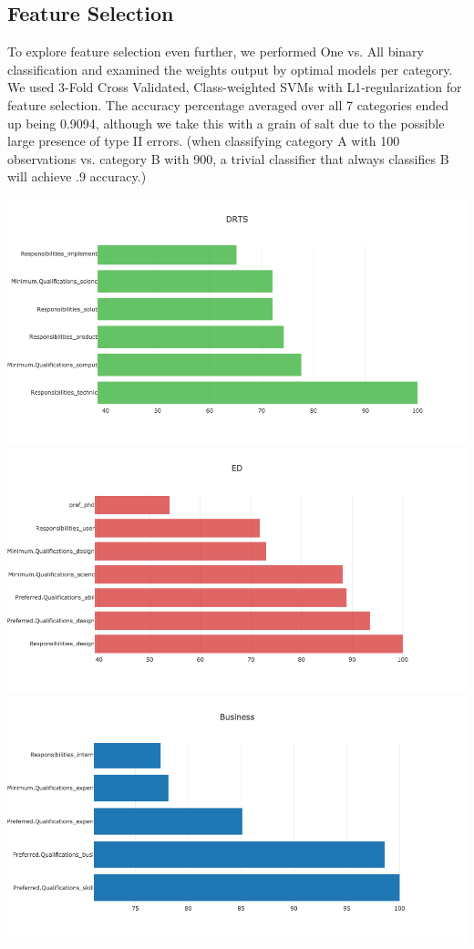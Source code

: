 \documentclass[9.5 pt]{article}
\begin{document}
\subsection{Feature Selection}

To explore feature selection even further, we performed One vs. All binary classification and examined the weights output by optimal models per category. We used 3-Fold Cross Validated, Class-weighted SVMs with L1-regularization for feature selection. The accuracy percentage averaged over all 7 categories ended up being 0.9094, although we take this with a grain of salt due to the possible large presence of type II errors. (when classifying category A with 100 observations vs. category B with 900, a trivial classifier that always classifies B will achieve .9 accuracy.)

\includegraphics[scale=.35, trim=6cm 0 0 0cm]{newplot}
\includegraphics[scale=.35, trim=9cm 0 0 0cm]{"newplot (1)"}
\includegraphics[scale=.35, trim=4.5cm 0 0 0cm]{"newplot (2)"}
\end{document}

